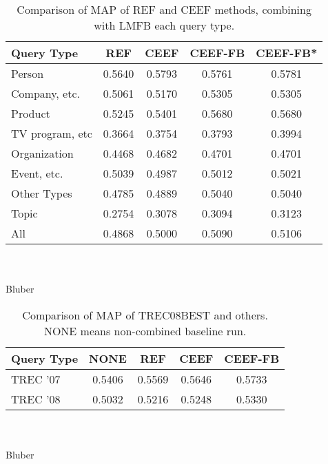 \begin{table}[h]
	\centering
		\begin{tabular}{lS[tabnumalign=centre,tabformat=1.4,decimalsymbol=comma]S[tabnumalign=centre,tabformat=1.4,decimalsymbol=comma]S[tabnumalign=centre,tabformat=1.4,decimalsymbol=comma]S[tabnumalign=centre,tabformat=1.4,decimalsymbol=comma]}
			\toprule
			Query Type & {REF} & {CEEF} & {CEEF-FB} & {CEEF-FB*}\\
			\midrule
			Person & 0.5640 & 0.5793 & 0.5761 & 0.5781\\
			Company, etc. & 0.5061 & 0.5170 & 0.5305 & 0.5305\\
			Product & 0.5245 & 0.5401 & 0.5680 & 0.5680\\
			TV program, etc & 0.3664 & 0.3754 & 0.3793 & 0.3994\\
			Organization & 0.4468 & 0.4682 & 0.4701 & 0.4701\\
			Event, etc. & 0.5039 & 0.4987 & 0.5012 & 0.5021\\
			Other Types & 0.4785 & 0.4889 & 0.5040 & 0.5040\\
			Topic & 0.2754 & 0.3078 & 0.3094 & 0.3123\\
			All & 0.4868 & 0.5000 & 0.5090 & 0.5106\\
			\bottomrule
		\end{tabular}
		\caption{Comparison of MAP of REF and CEEF methods, combining with LMFB each query type.\cite{paper:Na}}
\end{table}\\
\\
Bluber




\begin{table}[h]
	\centering
	\begin{tabular}{lS[tabnumalign=centre,tabformat=1.4,decimalsymbol=comma]S[tabnumalign=centre,tabformat=1.4,decimalsymbol=comma]S[tabnumalign=centre,tabformat=1.4,decimalsymbol=comma]S[tabnumalign=centre,tabformat=1.4,decimalsymbol=comma]}
		\toprule
		Query Type & {NONE} & {REF} & {CEEF} & {CEEF-FB}\\
		\midrule
		TREC '07 & 0.5406 & 0.5569 & 0.5646 & 0.5733\\
		TREC '08 & 0.5032 & 0.5216 & 0.5248 & 0.5330\\
		\bottomrule
	\end{tabular}
	\caption{Comparison of MAP of TREC08BEST and others. NONE means non-combined baseline run.}
	\cite{paper:Na}
\end{table}\\
\\
Bluber

